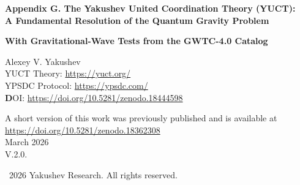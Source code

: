 \documentclass[12pt,a4paper]{article}
\theoremstyle{remark}
\newcommand{\Keff}{K_{\mathrm{eff}}}
\begin{document}
	
	\begin{titlepage}
		\begin{center}
			\vspace*{0cm}
			
			\Huge\textbf{Appendix G. The Yakushev United Coordination Theory (YUCT): \\ A Fundamental Resolution of the Quantum Gravity Problem}
			
			\vspace{0.5cm}
			\Large\textbf{With Gravitational-Wave Tests from the GWTC-4.0 Catalog}
			
			\vspace{1cm}
			\Large
			Alexey V. Yakushev\\
			
	YUCT Theory: \url{https://yuct.org/}\\
YPSDC Protocol: \url{https://ypsdc.com/}\\


\vspace{2cm}
\textbf DOI: \url{https://doi.org/10.5281/zenodo.18444598}\\

\vspace{1cm}

\vspace{0cm}
\large 
A short version of this work was previously published and is available at\\ \url{https://doi.org/10.5281/zenodo.18362308}\\
\vspace{1cm}
March 2026 \\ \large V.2.0.
			
			\vspace{5cm}
			\textcopyright~2026 Yakushev Research. All rights reserved.
			
			\newpage
			
			\begin{abstract}
				\noindent
				This paper presents a complete mathematical formulation of the Yakushev United Coordination Theory (YUCT) as a definitive solution to the quantum gravity problem. Unlike conventional approaches that attempt to quantize spacetime or gravitons, YUCT posits that both quantum mechanics and general relativity emerge from a more fundamental principle of \emph{coordination}. We develop: (1) A 19-dimensional geometric framework with coordination fields $\Psi_{MN}$, (2) The D+I•R triad as ontological basis, (3) A total Lagrangian $\mathcal{L}_{\text{YUCT}}$ that unifies all physical interactions through coordination efficiency $\Keff$, (4) Derivation of both quantum dynamics and gravitational geometry as limiting cases, (5) Specific predictions for quantum-gravitational phenomena testable at laboratory and astrophysical scales. The theory eliminates the conceptual contradictions between quantum nonlocality and relativistic causality, provides a natural explanation for dark energy and dark matter, and offers a mathematically consistent framework where the ``quantum gravity problem'' dissolves into the general theory of coordinated systems.
				

\end{abstract}
\end{center}
\end{titlepage}
\end{document}
